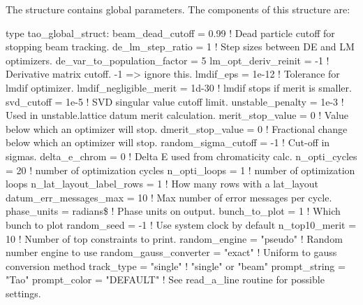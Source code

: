 {{{{{{{{{
The  structure contains \tao global parameters. The components of this structure are:
\begin{example}
type tao_global_struct:
  beam_dead_cutoff = 0.99           ! Dead particle cutoff for stopping beam tracking.
  de_lm_step_ratio = 1              ! Step sizes between DE and LM optimizers.
  de_var_to_population_factor = 5 
  lm_opt_deriv_reinit = -1          ! Derivative matrix cutoff. -1 => ignore this.
  lmdif_eps = 1e-12                 ! Tolerance for lmdif optimizer.
  lmdif_negligible_merit = 1d-30    ! lmdif stops if merit is smaller.
  svd_cutoff = 1e-5                 ! SVD singular value cutoff limit.
  unstable_penalty = 1e-3           ! Used in unstable.lattice datum merit calculation.
  merit_stop_value = 0              ! Value below which an optimizer will stop.
  dmerit_stop_value = 0             ! Fractional change below which an optimizer will stop.
  random_sigma_cutoff = -1          ! Cut-off in sigmas.
  delta_e_chrom = 0                 ! Delta E used from chromaticity calc.
  n_opti_cycles = 20                ! number of optimization cycles
  n_opti_loops = 1                  ! number of optimization loops
  n_lat_layout_label_rows = 1       ! How many rows with a lat_layout
  datum_err_messages_max = 10       ! Max number of error messages per cycle.
  phase_units = radians\$           ! Phase units on output.
  bunch_to_plot = 1                 ! Which bunch to plot
  random_seed = -1                  ! Use system clock by default
  n_top10_merit = 10                ! Number of top constraints to print.
  random_engine = "pseudo"          ! Random number engine to use
  random_gauss_converter = "exact"  ! Uniform to gauss conversion method
  track_type = "single"             ! "single" or "beam" 
  prompt_string = "Tao"
  prompt_color = "DEFAULT"          ! See read_a_line routine for possible settings.

\end{example}}}}}}}}}}
